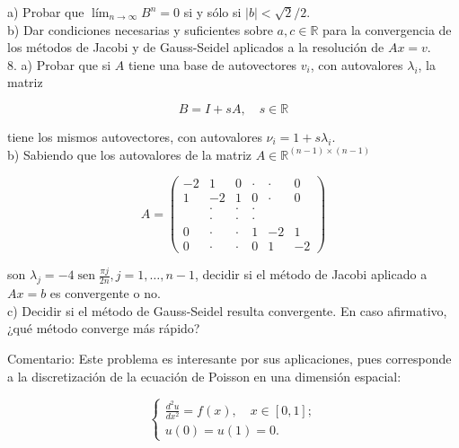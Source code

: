 \documentclass[10pt]{book}
\begin{document}
a) Probar que $\operatorname{lím}_{n \rightarrow \infty} B^{n}=0$ si y sólo si $|b|<\sqrt{2} / 2$.\\
b) Dar condiciones necesarias y suficientes sobre $a, c \in \mathbb{R}$ para la convergencia de los métodos de Jacobi y de Gauss-Seidel aplicados a la resolución de $A x=v$.\\
8. a) Probar que si $A$ tiene una base de autovectores $v_{i}$, con autovalores $\lambda_{i}$, la matriz

$$
B=I+s A, \quad s \in \mathbb{R}
$$

tiene los mismos autovectores, con autovalores $\nu_{i}=1+s \lambda_{i}$.\\
b) Sabiendo que los autovalores de la matriz $A \in \mathbb{R}^{(n-1) \times(n-1)}$

$$
A=\left(\begin{array}{cccccc}
-2 & 1 & 0 & \cdot & \cdot & 0 \\
1 & -2 & 1 & 0 & \cdot & 0 \\
& \cdot & \cdot & \cdot & & \\
& \cdot & \cdot & \cdot & & \\
0 & \cdot & \cdot & 1 & -2 & 1 \\
0 & \cdot & \cdot & 0 & 1 & -2
\end{array}\right)
$$

son $\lambda_{j}=-4 \operatorname{sen} \frac{\pi j}{2 n}, j=1, \ldots, n-1$, decidir si el método de Jacobi aplicado a $A x=b$ es convergente o no.\\
c) Decidir si el método de Gauss-Seidel resulta convergente. En caso afirmativo, ¿qué método converge más rápido?

Comentario: Este problema es interesante por sus aplicaciones, pues corresponde a la discretización de la ecuación de Poisson en una dimensión espacial:

$$
\left\{\begin{array}{l}
\frac{d^{2} u}{d x^{2}}=f(x), \quad x \in[0,1] ; \\
u(0)=u(1)=0 .
\end{array}\right.
$$
\end{document}
